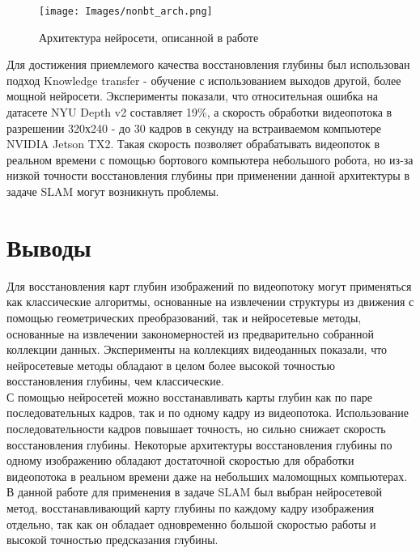 \documentclass{mipt-thesis-bs}
\begin{document}
\begin{figure}
	\centering
	\texttt{[image: Images/nonbt\_arch.png]}
	\label{figurecream}
	\caption{Архитектура нейросети, описанной в работе \cite{spek2018cream}}
\end{figure}

Для достижения приемлемого качества восстановления глубины был использован подход Knowledge transfer - обучение с использованием выходов другой, более мощной нейросети. Эксперименты показали, что относительная ошибка на датасете NYU Depth v2 составляет 19\%, а скорость обработки видеопотока в разрешении 320х240 - до 30 кадров в секунду на встраиваемом компьютере NVIDIA Jetson TX2. Такая скорость позволяет обрабатывать видеопоток в реальном времени с помощью бортового компьютера небольшого робота, но из-за низкой точности восстановления глубины при применении данной архитектуры в задаче SLAM могут возникнуть проблемы.\\

\section{Выводы}
Для восстановления карт глубин изображений по видеопотоку могут применяться как классические алгоритмы, основанные на извлечении структуры из движения с помощью геометрических преобразований, так и нейросетевые методы, основанные на извлечении закономерностей из предварительно собранной коллекции данных. Эксперименты на коллекциях видеоданных показали, что нейросетевые методы обладают в целом более высокой точностью восстановления глубины, чем классические.\\
С помощью нейросетей можно восстанавливать карты глубин как по паре последовательных кадров, так и по одному кадру из видеопотока. Использование последовательности кадров повышает точность, но сильно снижает скорость восстановления глубины. Некоторые архитектуры восстановления глубины по одному изображению обладают достаточной скоростью для обработки видеопотока в реальном времени даже на небольших маломощных компьютерах.\\
В данной работе для применения в задаче SLAM был выбран нейросетевой метод, восстанавливающий карту глубины по каждому кадру изображения отдельно, так как он обладает одновременно большой скоростью работы и высокой точностью предсказания глубины.

\end{document}
